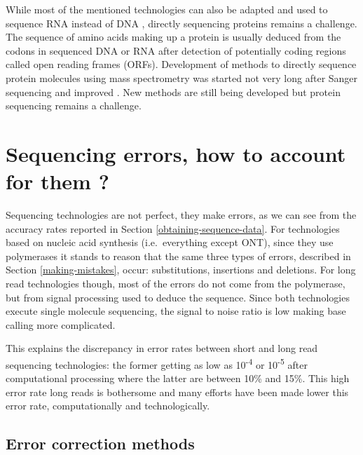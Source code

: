 \documentclass[
  11pt,
  twoside,
  BCOR=10mm,
  listof=totoc]{scrbook}
\begin{document}
While most of the mentioned technologies can also be adapted and used to sequence RNA instead of DNA \autocite{hongRNASequencingNew2020,ozsolakRNASequencingAdvances2011}, directly sequencing proteins remains a challenge. The sequence of amino acids making up a protein is usually deduced from the codons in sequenced DNA or RNA after detection of potentially coding regions called open reading frames (ORFs). Development of methods to directly sequence protein molecules using mass spectrometry was started not very long after Sanger sequencing \autocite{huntProteinSequencingTandem1986} and improved \autocite{smithProteinSequencingProtocols2002}. New methods are still being developed \autocite{restrepo-perezPavingWaySinglemolecule2018} but protein sequencing remains a challenge.

\hypertarget{sequencing-errors-how-to-account-for-them}{%
\section{Sequencing errors, how to account for them ?}\label{sequencing-errors-how-to-account-for-them}}

Sequencing technologies are not perfect, they make errors, as we can see from the accuracy rates reported in Section \ref{obtaining-sequence-data}. For technologies based on nucleic acid synthesis (i.e.~everything except ONT), since they use polymerases it stands to reason that the same three types of errors, described in Section \ref{making-mistakes}, occur: substitutions, insertions and deletions. For long read technologies though, most of the errors do not come from the polymerase, but from signal processing used to deduce the sequence. Since both technologies execute single molecule sequencing, the signal to noise ratio is low \autocite{weirather2017,wangNanoporeSequencingTechnology2021} making base calling more complicated.

This explains the discrepancy in error rates between short and long read sequencing technologies: the former getting as low as 10\textsuperscript{-4} or 10\textsuperscript{-5} after computational processing \autocite{maAnalysisErrorProfiles2019} where the latter are between 10\% and 15\%. This high error rate long reads is bothersome and many efforts have been made lower this error rate, computationally and technologically.

\hypertarget{error-correction-methods}{%
\subsection{Error correction methods}\label{error-correction-methods}}
\end{document}
